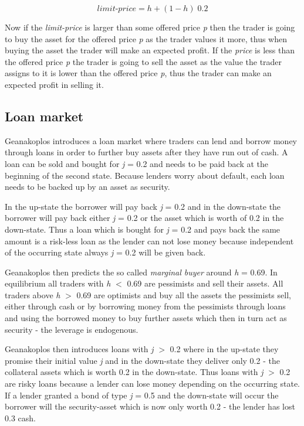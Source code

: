 \documentclass[../Bachelorarbeit.tex]{subfiles}
\begin{document}
\begin{equation}
\textit{limit-price} = h + (1 - h) \; 0.2
\end{equation}

Now if the \textit{limit-price} is larger than some offered price \textit{p} then the trader is going to buy the asset for the offered price \textit{p} as the trader values it more, thus when buying the asset the trader will make an expected profit. If the \textit{price} is less than the offered price \textit{p} the trader is going to sell the asset as the value the trader assigns to it is lower than the offered price \textit{p}, thus the trader can make an expected profit in selling it.

\subsection{Loan market}
Geanakoplos introduces a loan market where traders can lend and borrow money through loans in order to further buy assets after they have run out of cash. A loan can be sold and bought for \textit{j} = 0.2 and needs to be paid back at the beginning of the second state. Because lenders worry about default, each loan needs to be backed up by an asset as security.

\medskip

In the up-state the borrower will pay back \textit{j} = 0.2 and in the down-state the borrower will pay back either \textit{j} = 0.2 or the asset which is worth of 0.2 in the down-state. Thus a loan which is bought for \textit{j} = 0.2 and pays back the same amount is a risk-less loan as the lender can not lose money because independent of the occurring state always \textit{j} = 0.2 will be given back.

\medskip

Geanakoplos then predicts the so called \textit{marginal buyer} around \textit{h} = 0.69. In equilibrium all traders with \textit{h} $<$ 0.69 are pessimists and sell their assets. All traders above \textit{h} $>$ 0.69 are optimists and buy all the assets the pessimists sell, either through cash or by borrowing money from the pessimists through loans and using the borrowed money to buy further assets which then in turn act as security - the leverage is endogenous.

\medskip

Geanakoplos then introduces loans with \textit{j} $>$ 0.2 where in the up-state they promise their initial value \textit{j} and in the down-state they deliver only 0.2 - the collateral assets which is worth 0.2 in the down-state. Thus loans with \textit{j} $>$ 0.2 are risky loans because a lender can lose money depending on the occurring state. If a lender granted a bond of type \textit{j} = 0.5 and the down-state will occur the borrower will the security-asset which is now only worth 0.2 - the lender has lost 0.3 cash.
\end{document}
